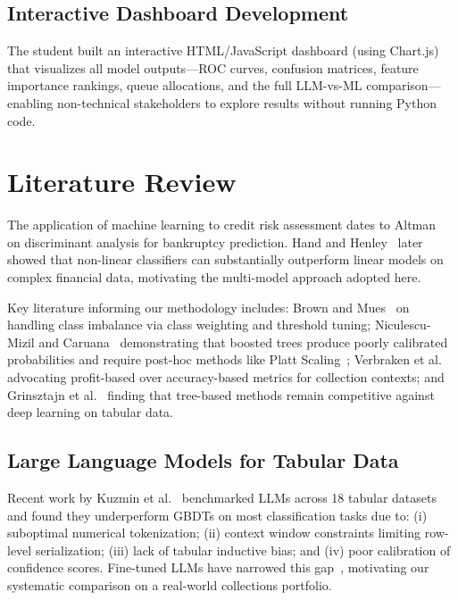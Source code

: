 \documentclass[12pt, a4paper]{article}
\begin{document}
\subsection{Interactive Dashboard Development}

The student built an interactive HTML/JavaScript dashboard (using Chart.js) that visualizes all model outputs---ROC curves, confusion matrices, feature importance rankings, queue allocations, and the full LLM-vs-ML comparison---enabling non-technical stakeholders to explore results without running Python code.


\section{Literature Review}\label{sec:litreview}

The application of machine learning to credit risk assessment dates to Altman~\cite{altman1968} on discriminant analysis for bankruptcy prediction. Hand and Henley~\cite{hand1997} later showed that non-linear classifiers can substantially outperform linear models on complex financial data, motivating the multi-model approach adopted here.

Key literature informing our methodology includes: Brown and Mues~\cite{brown2012} on handling class imbalance via class weighting and threshold tuning; Niculescu-Mizil and Caruana~\cite{niculescu2005} demonstrating that boosted trees produce poorly calibrated probabilities and require post-hoc methods like Platt Scaling~\cite{platt1999}; Verbraken et al.~\cite{verbraken2014} advocating profit-based over accuracy-based metrics for collection contexts; and Grinsztajn et al.~\cite{grinsztajn2022} finding that tree-based methods remain competitive against deep learning on tabular data.

\subsection{Large Language Models for Tabular Data}

Recent work by Kuzmin et al.~\cite{kuzmin2024tabllm} benchmarked LLMs across 18 tabular datasets and found they underperform GBDTs on most classification tasks due to: (i) suboptimal numerical tokenization; (ii) context window constraints limiting row-level serialization; (iii) lack of tabular inductive bias; and (iv) poor calibration of confidence scores. Fine-tuned LLMs have narrowed this gap~\cite{Grinsztajn2024LLM}, motivating our systematic comparison on a real-world collections portfolio.
\end{document}
